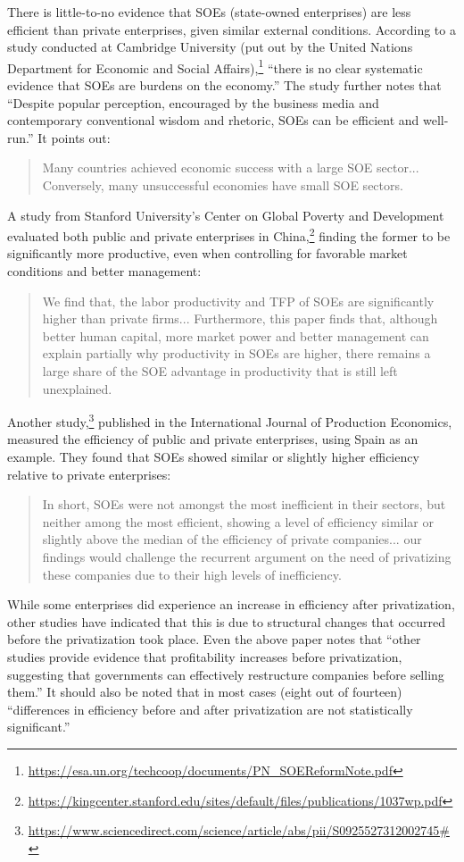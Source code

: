 There is little-to-no evidence that SOEs (state-owned enterprises) are less efficient than private enterprises, given similar external conditions.
According to a study conducted at Cambridge University (put out by the United Nations Department for Economic and Social Affairs),\footnote{\href{https://esa.un.org/techcoop/documents/PN_SOEReformNote.pdf}{https://esa.un.org/techcoop/documents/PN\_SOEReformNote.pdf}} ``there is no clear systematic evidence that SOEs are burdens on the economy.''
The study further notes that ``Despite popular perception, encouraged by the business media and contemporary conventional wisdom and rhetoric, SOEs can be efficient and well-run.''
It points out:
\begin{quote}
Many countries achieved economic success with a large SOE sector... Conversely, many unsuccessful economies have small SOE sectors.
\end{quote}
A study from Stanford University's Center on Global Poverty and Development evaluated both public and private enterprises in China,\footnote{\href{https://kingcenter.stanford.edu/sites/default/files/publications/1037wp.pdf}{https://kingcenter.stanford.edu/sites/default/files/publications/1037wp.pdf}} finding the former to be significantly more productive, even when controlling for favorable market conditions and better management:
\begin{quote}
We find that, the labor productivity and TFP of SOEs are significantly higher than private firms... Furthermore, this paper finds that, although better human capital, more market power and better management can explain partially why productivity in SOEs are higher, there remains a large share of the SOE advantage in productivity that is still left unexplained.
\end{quote}
Another study,\footnote{\href{https://www.sciencedirect.com/science/article/abs/pii/S0925527312002745\#}{https://www.sciencedirect.com/science/article/abs/pii/S0925527312002745\#}} published in the International Journal of Production Economics, measured the efficiency of public and private enterprises, using Spain as an example.
They found that SOEs showed similar or slightly higher efficiency relative to private enterprises:
\begin{quote}
In short, SOEs were not amongst the most inefficient in their sectors, but neither among the most efficient, showing a level of efficiency similar or slightly above the median of the efficiency of private companies... our findings would challenge the recurrent argument on the need of privatizing these companies due to their high levels of inefficiency.
\end{quote}
While some enterprises did experience an increase in efficiency after privatization, other studies have indicated that this is due to structural changes that occurred before the privatization took place.
Even the above paper notes that ``other studies provide evidence that profitability increases before privatization, suggesting that governments can effectively restructure companies before selling them.''
It should also be noted that in most cases (eight out of fourteen) ``differences in efficiency before and after privatization are not statistically significant.''

